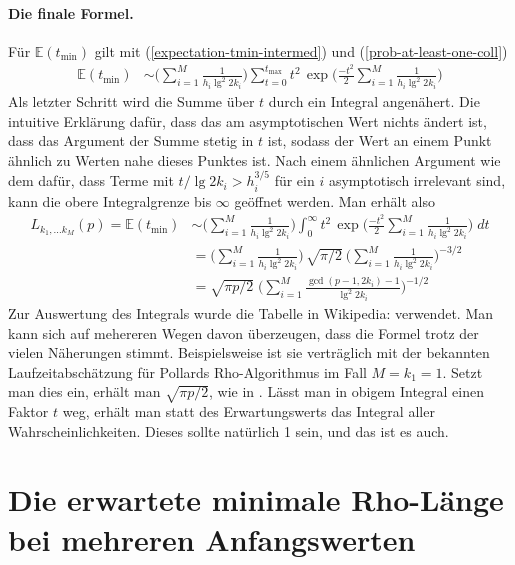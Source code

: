 \documentclass[a4paper, 10pt, ngerman]{article}
\newcommand{\E}{\mathbb{E}}
\begin{document}
\paragraph*{Die finale Formel.} Für $\E(t_{\min})$ gilt mit (\ref{expectation-tmin-intermed}) und (\ref{prob-at-least-one-coll})
\begin{align*}
    \E(t_{\min})
     & \sim \Bigg ( \sum_{i = 1}^M \frac 1 {h_i \lg^2 2k_i} \Bigg )
    \sum_{t = 0}^{t_{\max}} t^2 \, \exp \Bigg ( \frac {-t^2} 2
    \sum_{i = 1}^M \frac 1 {h_i \lg^2 2k_i} \Bigg )
\end{align*}
Als letzter Schritt wird die Summe über $t$ durch ein Integral angenähert. Die intuitive Erklärung dafür, dass das am asymptotischen Wert nichts ändert ist, dass das Argument der Summe stetig in $t$ ist, sodass der Wert an einem Punkt ähnlich zu Werten nahe dieses Punktes ist. Nach einem ähnlichen Argument wie dem dafür, dass Terme mit $t/\lg 2k_i > h_i^{3/5}$ für ein $i$ asymptotisch irrelevant sind, kann die obere Integralgrenze bis $\infty$ geöffnet werden. Man erhält also
\begin{align}
    L_{k_1, \dots k_M}(p) = \E(t_{\min})
     & \sim \Bigg ( \sum_{i = 1}^M \frac 1 {h_i \lg^2 2k_i} \Bigg )
    \int_{0}^{\infty} t^2 \, \exp \Bigg ( \frac {-t^2} 2
    \sum_{i = 1}^M \frac 1 {h_i \lg^2 2k_i} \Bigg ) \; dt
    \nonumber                                                       \\
     & = \Bigg (\sum_{i = 1}^M \frac 1 {h_i \lg^2 2k_i} \Bigg ) \,
    \sqrt {\pi / 2} \
    \Bigg ( \sum_{i = 1}^M \frac 1 {h_i \lg^2 2k_i} \Bigg )^{-3/2}
    \nonumber                                                       \\
     & = \sqrt{\pi p / 2} \; \Bigg (
    \sum_{i = 1}^M \frac {\gcd(p - 1, 2k_i) - 1} {\lg^2 2k_i} \Bigg )^{-1/2}
    \label{expectation-tmin}
\end{align}
Zur Auswertung des Integrals wurde die Tabelle in Wikipedia: \cite{gint} verwendet. Man kann sich auf mehereren Wegen davon überzeugen, dass die Formel trotz der vielen Näherungen stimmt. Beispielsweise ist sie verträglich mit der bekannten Laufzeitabschätzung für Pollards Rho-Algorithmus im Fall $M = k_1 = 1$. Setzt man dies ein, erhält man $\sqrt{\pi p / 2}$, wie in \cite{pol75}. Lässt man in obigem Integral einen Faktor $t$ weg, erhält man statt des Erwartungswerts das Integral aller Wahrscheinlichkeiten. Dieses sollte natürlich 1 sein, und das ist es auch.

\section{Die erwartete minimale Rho-Länge bei mehreren Anfangswerten}
\end{document}
